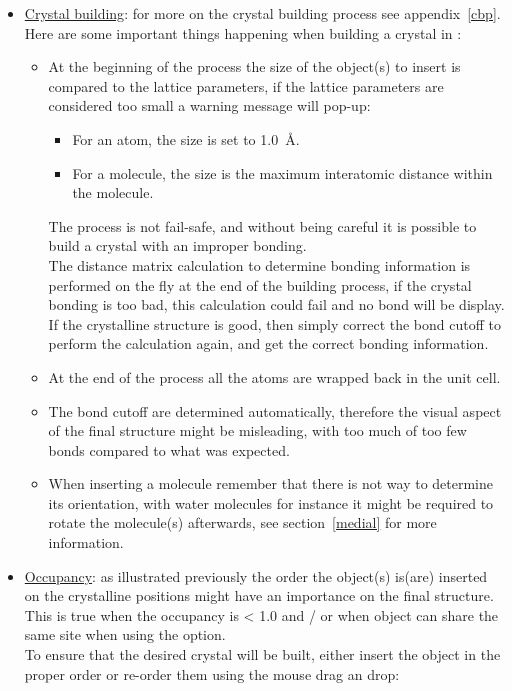 \begin{itemize}
\item \uline{Crystal building}: for more on the crystal building process see appendix~\ref{cbp}. \\[0.25cm]
Here are some important things happening when building a crystal in \atomes:
\begin{itemize}
\item At the beginning of the process the size of the object(s) to insert is compared to the lattice parameters, 
if the lattice parameters are considered too small a warning message will pop-up: 
\begin{itemize}
\item For an atom, the size is set to 1.0~\AA.
\item For a molecule, the size is the maximum interatomic distance within the molecule.
\end{itemize}
The process is not fail-safe, and without being careful it is possible to build a crystal with an improper bonding. \\
The distance matrix calculation to determine bonding information is performed on the fly at the end of the building process,
if the crystal bonding is too bad, this calculation could fail and no bond will be display. 
If the crystalline structure is good, then simply correct the bond cutoff to perform the calculation again, 
and get the correct bonding information.  
\item At the end of the process all the atoms are wrapped back in the unit cell. 
\item The bond cutoff are determined automatically, therefore the visual aspect of the final structure might be misleading, 
with too much of too few bonds compared to what was expected.
\item When inserting a molecule remember that there is not way to determine its orientation, with water molecules for instance 
it might be required to rotate the molecule(s) afterwards, see section~\ref{medial} for more information.
\end{itemize}
\item \uline{Occupancy}:
as illustrated previously the order the object(s) is(are) inserted on the crystalline positions might have an importance on the final structure. 
This is true when the occupancy is < 1.0 and / or when object can share the same site when using the  option. \\
To ensure that the desired crystal will be built, either insert the object in the proper order or re-order them using the mouse drag an drop:

\end{itemize}
